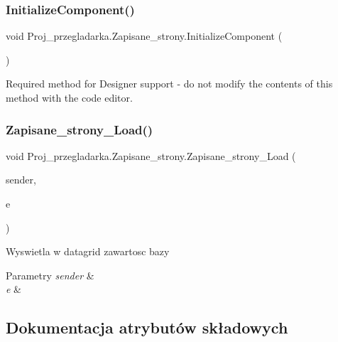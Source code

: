 \subsubsection{\texorpdfstring{InitializeComponent()}{InitializeComponent()}}
{\footnotesize\ttfamily void Proj\+\_\+przegladarka.\+Zapisane\+\_\+strony.\+Initialize\+Component (\begin{DoxyParamCaption}{ }\end{DoxyParamCaption})\hspace{0.3cm}{\ttfamily [private]}}



Required method for Designer support -\/ do not modify the contents of this method with the code editor. 

\mbox{\label{class_proj__przegladarka_1_1_zapisane__strony_ad24df49b7b0ef00baac855d3a67582b7}} 
\subsubsection{\texorpdfstring{Zapisane\_strony\_Load()}{Zapisane\_strony\_Load()}}
{\footnotesize\ttfamily void Proj\+\_\+przegladarka.\+Zapisane\+\_\+strony.\+Zapisane\+\_\+strony\+\_\+\+Load (\begin{DoxyParamCaption}\item[{object}]{sender,  }\item[{Event\+Args}]{e }\end{DoxyParamCaption})\hspace{0.3cm}{\ttfamily [private]}}



Wyswietla w datagrid zawartosc bazy 


\begin{DoxyParams}{Parametry}
{\em sender} & \\
\hline
{\em e} & \\
\hline
\end{DoxyParams}


\subsection{Dokumentacja atrybutów składowych}
\mbox{\label{class_proj__przegladarka_1_1_zapisane__strony_a7ff474026c9ee3e0291b8e826dd6f9e6}} 
